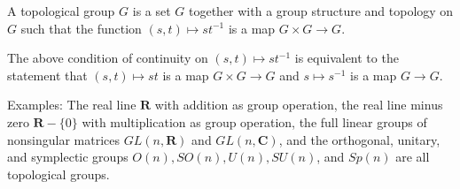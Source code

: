 A topological group $G$ is a set $G$ together with a group structure and topology on $G$ such that the function $(s, t) \mapsto st^{-1}$ is a map $G \times G \rightarrow G$.

The above condition of continuity on $(s, t) \mapsto st^{-1}$ is equivalent to the statement that $(s, t) \mapsto st$ is a map $G \times G \rightarrow G$ and $s \mapsto s^{-1}$ is a map $G \rightarrow G$.

Examples: The real line $\mathbf{R}$ with addition as group operation, the real line minus zero $\mathbf{R} - \{0\}$ with multiplication as group operation, the full linear groups of nonsingular matrices $GL(n, \mathbf{R})$ and $GL(n, \mathbf{C})$, and the orthogonal, unitary, and symplectic groups $O(n), SO(n), U(n), SU(n)$, and $Sp(n)$ are all topological groups.